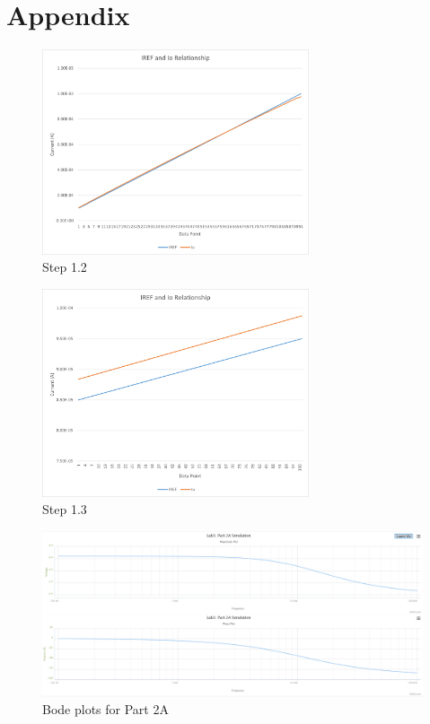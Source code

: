 \documentclass[12pt]{article}
\begin{document}
\section*{Appendix}
\begin{figure}[!ht]
    \centering
    \includegraphics[width=0.7\textwidth]{Step1.2}
    \caption{\label{fig:step1.2}Step 1.2}
\end{figure}
\begin{figure}[!ht]
    \centering
    \includegraphics[width=0.7\textwidth]{Step1.3}
    \caption{\label{fig:step1.3}Step 1.3}
\end{figure}
\begin{figure}[!ht]
    \centering
    \includegraphics[width=\textwidth]{part2bode}
    \caption{\label{fig:bode}Bode plots for Part 2A}
\end{figure}
\end{document}
